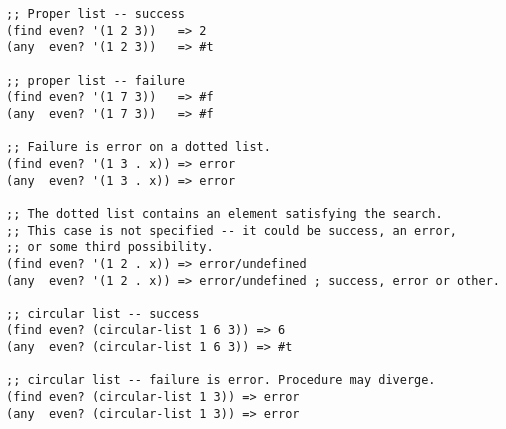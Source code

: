 \begin{verbatim}
;; Proper list -- success
(find even? '(1 2 3))   => 2
(any  even? '(1 2 3))   => #t

;; proper list -- failure
(find even? '(1 7 3))   => #f
(any  even? '(1 7 3))   => #f

;; Failure is error on a dotted list.
(find even? '(1 3 . x)) => error
(any  even? '(1 3 . x)) => error

;; The dotted list contains an element satisfying the search.
;; This case is not specified -- it could be success, an error, 
;; or some third possibility.
(find even? '(1 2 . x)) => error/undefined
(any  even? '(1 2 . x)) => error/undefined ; success, error or other.

;; circular list -- success
(find even? (circular-list 1 6 3)) => 6
(any  even? (circular-list 1 6 3)) => #t

;; circular list -- failure is error. Procedure may diverge.
(find even? (circular-list 1 3)) => error
(any  even? (circular-list 1 3)) => error
\end{verbatim}

